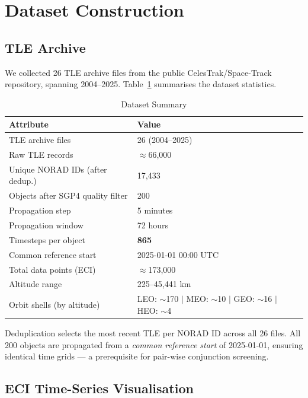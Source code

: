 \documentclass[conference]{IEEEtran}
\begin{document}
\section{Dataset Construction}
\label{sec:data}

\subsection{TLE Archive}

We collected 26 TLE archive files from the public CelesTrak/Space-Track
repository, spanning 2004--2025. Table~\ref{tab:dataset} summarises the
dataset statistics.

\begin{table}[H]
\centering
\caption{Dataset Summary}
\label{tab:dataset}
\begin{tabular}{ll}
\toprule
\textbf{Attribute} & \textbf{Value} \\
\midrule
TLE archive files & 26 (2004--2025) \\
Raw TLE records & $\approx$66{,}000 \\
Unique NORAD IDs (after dedup.) & 17{,}433 \\
Objects after SGP4 quality filter & 200 \\
Propagation step & 5 minutes \\
Propagation window & 72 hours \\
Timesteps per object & \textbf{865} \\
Common reference start & 2025-01-01 00:00 UTC \\
Total data points (ECI) & $\approx$173{,}000 \\
Altitude range & 225--45{,}441 km \\
Orbit shells (by altitude) & LEO: $\sim$170 $|$ MEO: $\sim$10 $|$ GEO: $\sim$16 $|$ HEO: $\sim$4 \\
\bottomrule
\end{tabular}
\end{table}

Deduplication selects the most recent TLE per NORAD ID across all 26 files.
All 200 objects are propagated from a \emph{common reference start} of
2025-01-01, ensuring identical time grids --- a prerequisite for pair-wise
conjunction screening.

\subsection{ECI Time-Series Visualisation}
\end{document}
